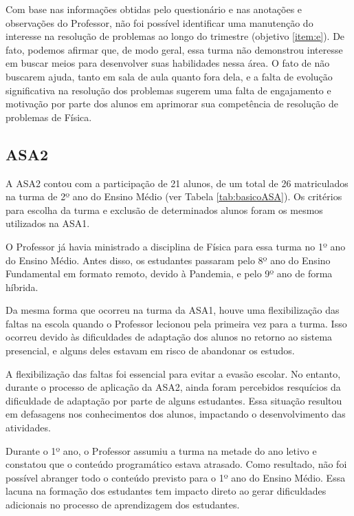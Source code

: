 Com base nas informações obtidas pelo questionário e nas anotações e observações do Professor, não foi possível identificar uma manutenção do interesse na resolução de problemas ao longo do trimestre (objetivo \ref{item:e}). De fato, podemos afirmar que, de modo geral, essa turma não demonstrou interesse em buscar meios para desenvolver suas habilidades nessa área. O fato de não buscarem ajuda, tanto em sala de aula quanto fora dela, e a falta de evolução significativa na resolução dos problemas sugerem uma falta de engajamento e motivação por parte dos alunos em aprimorar sua competência de resolução de problemas de Física.

\subsection{ASA2} \label{subsec:asa2}


A ASA2 contou com a participação de 21 alunos, de um total de 26 matriculados na turma de 2º ano do Ensino Médio (ver Tabela \ref{tab:basicoASA}). Os critérios para escolha da turma e exclusão de determinados alunos foram os mesmos utilizados na ASA1.

O Professor já havia ministrado a disciplina de Física para essa turma no 1º ano do Ensino Médio. Antes disso, os estudantes passaram pelo 8º ano do Ensino Fundamental em formato remoto, devido à Pandemia, e pelo 9º ano de forma híbrida.

Da mesma forma que ocorreu na turma da ASA1, houve uma flexibilização das faltas na escola quando o Professor lecionou pela primeira vez para a turma. Isso ocorreu devido às dificuldades de adaptação dos alunos no retorno ao sistema presencial, e alguns deles estavam em risco de abandonar os estudos.

A flexibilização das faltas foi essencial para evitar a evasão escolar. No entanto, durante o processo de aplicação da ASA2, ainda foram percebidos resquícios da dificuldade de adaptação por parte de alguns estudantes. Essa situação resultou em defasagens nos conhecimentos dos alunos, impactando o desenvolvimento das atividades.

Durante o 1º ano, o Professor assumiu a turma na metade do ano letivo e constatou que o conteúdo programático estava atrasado. Como resultado, não foi possível abranger todo o conteúdo previsto para o 1º ano do Ensino Médio. Essa lacuna na formação dos estudantes tem impacto direto ao gerar dificuldades adicionais no processo de aprendizagem dos estudantes.

